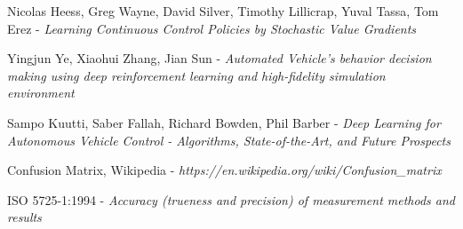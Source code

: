 \begin{thebibliography}{9}
Nicolas Heess, Greg Wayne, David Silver, Timothy Lillicrap, Yuval Tassa, Tom Erez - \textsl{Learning Continuous Control Policies by Stochastic Value Gradients}

Yingjun Ye, Xiaohui Zhang, Jian Sun - \textsl{Automated Vehicle's behavior decision making using deep reinforcement learning and high-fidelity simulation environment}

Sampo Kuutti, Saber Fallah, Richard Bowden, Phil Barber - \textsl{Deep Learning for Autonomous Vehicle Control - Algorithms, State-of-the-Art, and Future Prospects}

Confusion Matrix, Wikipedia - \textsl{https://en.wikipedia.org/wiki/Confusion\_matrix}

ISO 5725-1:1994 - \textsl{Accuracy (trueness and precision) of measurement methods and results}

\end{thebibliography}